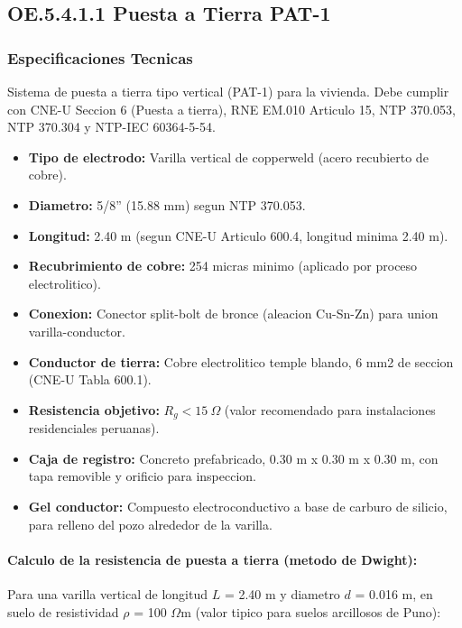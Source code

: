 \subsection{OE.5.4.1.1 Puesta a Tierra PAT-1}

\subsubsection{Especificaciones Tecnicas}

Sistema de puesta a tierra tipo vertical (PAT-1) para la vivienda. Debe cumplir con CNE-U Seccion 6 (Puesta a tierra), RNE EM.010 Articulo 15, NTP 370.053, NTP 370.304 y NTP-IEC 60364-5-54.

\begin{itemize}[nosep]
  \item \textbf{Tipo de electrodo:} Varilla vertical de copperweld (acero recubierto de cobre).
  \item \textbf{Diametro:} 5/8'' (15.88 mm) segun NTP 370.053.
  \item \textbf{Longitud:} 2.40 m (segun CNE-U Articulo 600.4, longitud minima 2.40 m).
  \item \textbf{Recubrimiento de cobre:} 254 micras minimo (aplicado por proceso electrolitico).
  \item \textbf{Conexion:} Conector split-bolt de bronce (aleacion Cu-Sn-Zn) para union varilla-conductor.
  \item \textbf{Conductor de tierra:} Cobre electrolitico temple blando, 6 mm2 de seccion (CNE-U Tabla 600.1).
  \item \textbf{Resistencia objetivo:} $R_g < 15\ \Omega$ (valor recomendado para instalaciones residenciales peruanas).
  \item \textbf{Caja de registro:} Concreto prefabricado, 0.30 m x 0.30 m x 0.30 m, con tapa removible y orificio para inspeccion.
  \item \textbf{Gel conductor:} Compuesto electroconductivo a base de carburo de silicio, para relleno del pozo alrededor de la varilla.
\end{itemize}

\paragraph{Calculo de la resistencia de puesta a tierra (metodo de Dwight):}
Para una varilla vertical de longitud $L$ = 2.40 m y diametro $d$ = 0.016 m, en suelo de resistividad $\rho$ = 100 $\Omega$m (valor tipico para suelos arcillosos de Puno):

